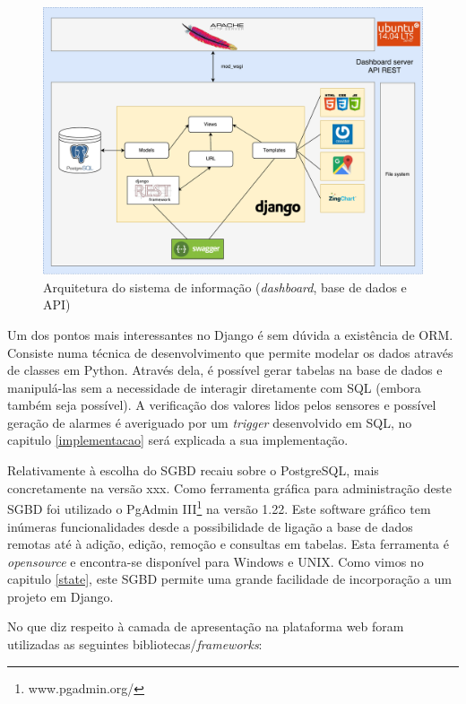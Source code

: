 \newpage
\begin{figure}[h]
	\centering
	\includegraphics[width=\linewidth]{esquemas/fisica-si.pdf}
	\caption{Arquitetura do sistema de informação (\textit{dashboard}, base de dados e API)}
	\label{arquiteturasi}
\end{figure}




Um dos pontos mais interessantes no Django é sem dúvida a existência de \linebreak \ac{ORM}. Consiste numa técnica de desenvolvimento que permite modelar os dados através de classes em Python. Através dela, é possível gerar tabelas na base de dados e manipulá-las sem a necessidade de interagir diretamente com \ac{SQL} (embora também seja possível). A verificação dos valores lidos pelos sensores e possível geração de alarmes é averiguado por um \textit{trigger} desenvolvido em \ac{SQL}, no capitulo \ref{implementacao} será explicada a sua implementação.  


Relativamente à escolha do \ac{SGBD} recaiu sobre o PostgreSQL, mais concretamente na versão xxx. Como ferramenta gráfica para administração deste \ac{SGBD} foi utilizado o PgAdmin III\footnote{www.pgadmin.org/} na versão 1.22. Este software gráfico tem inúmeras funcionalidades desde a possibilidade de ligação a base de dados remotas até à adição, edição, remoção e  consultas em tabelas. Esta ferramenta é \textit{opensource} e encontra-se disponível para Windows e UNIX. Como vimos no capitulo \ref{state}, este \ac{SGBD} permite uma grande facilidade de incorporação a um projeto em Django. 


No que diz respeito à camada de apresentação na plataforma web foram utilizadas as seguintes bibliotecas/\textit{frameworks}: 

